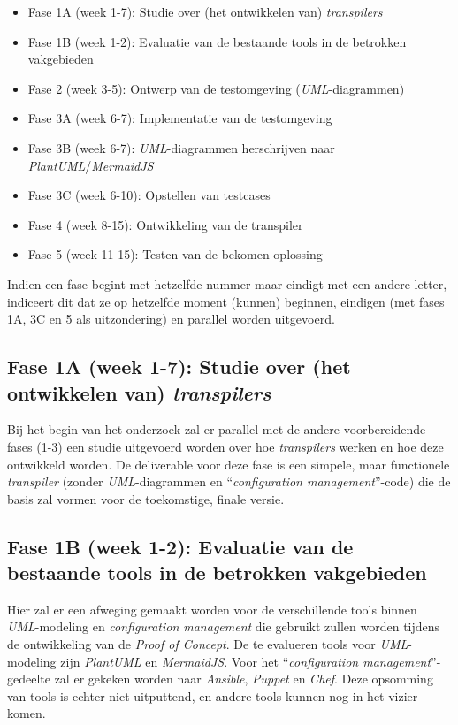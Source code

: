 \begin{itemize}
  \item{Fase 1A (week 1-7): Studie over (het ontwikkelen van) \emph{transpilers}}
  \item{Fase 1B (week 1-2): Evaluatie van de bestaande tools in de betrokken vakgebieden}
  \item{Fase 2 (week 3-5): Ontwerp van de testomgeving (\emph{UML}-diagrammen)}
  \item{Fase 3A (week 6-7): Implementatie van de testomgeving}
  \item{Fase 3B (week 6-7): \emph{UML}-diagrammen herschrijven naar \emph{PlantUML}/\emph{MermaidJS}}
  \item{Fase 3C (week 6-10): Opstellen van testcases}
  \item{Fase 4 (week 8-15): Ontwikkeling van de transpiler}
  \item{Fase 5 (week 11-15): Testen van de bekomen oplossing}
\end{itemize}

Indien een fase begint met hetzelfde nummer maar eindigt met een andere letter, indiceert dit dat ze op hetzelfde moment (kunnen) beginnen, eindigen (met fases 1A, 3C en 5 als uitzondering) en parallel worden uitgevoerd.

\subsection{Fase 1A (week 1-7): Studie over (het ontwikkelen van) \emph{transpilers}}%
\label{subsec:voorstel_studie_ontwikkelen_transpilers}

Bij het begin van het onderzoek zal er parallel met de andere voorbereidende fases (1-3) een studie uitgevoerd worden over hoe \emph{transpilers} werken en hoe deze ontwikkeld worden.
De deliverable voor deze fase is een simpele, maar functionele \emph{transpiler} (zonder \emph{UML}-diagrammen en ``\emph{configuration management}''-code) die de basis zal vormen voor de toekomstige, finale versie.

\subsection{Fase 1B (week 1-2): Evaluatie van de bestaande tools in de betrokken vakgebieden}%
\label{subsec:voorstel_evaluatie_bestaande_tools_betrokken_vakgebieden}

Hier zal er een afweging gemaakt worden voor de verschillende tools binnen \emph{UML}-modeling en \emph{configuration management} die gebruikt zullen worden tijdens de ontwikkeling van de \emph{Proof of Concept}.
De te evalueren tools voor \emph{UML}-modeling zijn \emph{PlantUML} en \emph{MermaidJS}. Voor het ``\emph{configuration management}''-gedeelte zal er gekeken worden naar \emph{Ansible}, \emph{Puppet} en \emph{Chef}. Deze opsomming van tools is echter niet-uitputtend, en andere tools kunnen nog in het vizier komen.


